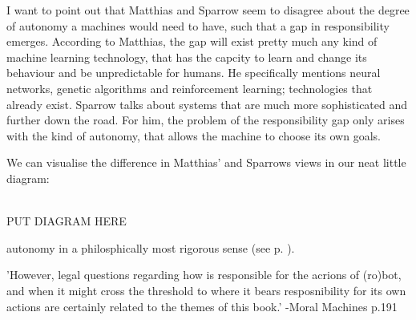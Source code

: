 \documentclass{article}
\begin{document}
I want to point out that Matthias and Sparrow seem to disagree about the degree of
autonomy a machines would need to have, such that a gap in responsibility
emerges. According to Matthias, the gap will exist pretty much any kind of
machine learning technology, that has the capcity to learn and change its
behaviour and be unpredictable for humans. He specifically mentions neural
networks, genetic algorithms and reinforcement learning; technologies that
already exist. Sparrow talks about systems that are much more sophisticated and
further down the road. For him, the problem of the responsibility gap only
arises with the kind of autonomy, that allows the machine to choose its own
goals.

We can visualise the difference in Matthias' and Sparrows views in our neat
little diagram:



\\

PUT DIAGRAM HERE

 autonomy in a philosphically most rigorous sense (see p.
\pageref{sparrow_autonomy}).

'However, legal questions regarding how is responsible for the acrions of
(ro)bot, and when it might cross the threshold to where it bears resposnibility
for its own actions are certainly related to the themes of this book.' -Moral
Machines p.191


\end{document}
